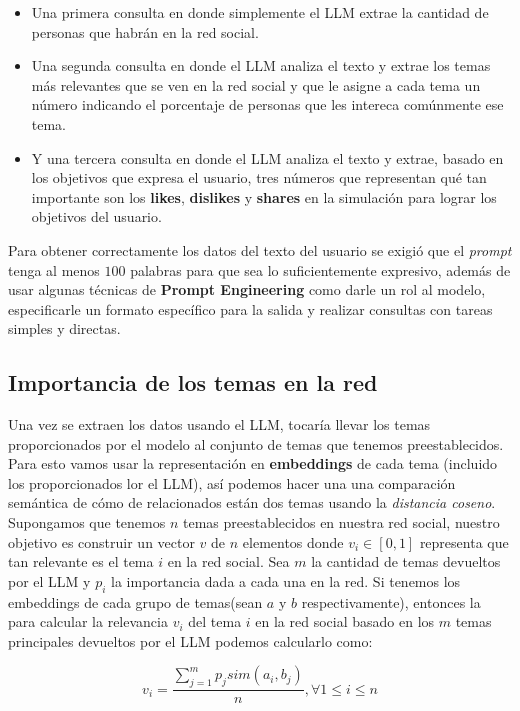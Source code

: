 \documentclass[acmtog]{acmart}
\begin{document}
\begin{itemize}
    \item Una primera consulta en donde simplemente el LLM extrae la cantidad de personas que habrán en la red social.
    \item Una segunda consulta en donde el LLM analiza el texto y extrae los temas más relevantes que se ven en la red social y que le asigne a cada tema un número indicando el porcentaje de personas que les intereca comúnmente ese tema.
    \item Y una tercera consulta en donde el LLM analiza el texto y extrae, basado en los objetivos que expresa el usuario, tres números que representan qué tan importante son los \textbf{likes}, \textbf{dislikes} y \textbf{shares} en la simulación para lograr los objetivos del usuario.
\end{itemize}

Para obtener correctamente los datos del texto del usuario se exigió que el \textit{prompt} tenga al menos $100$ palabras para que sea lo suficientemente expresivo, además de usar algunas técnicas de \textbf{Prompt Engineering} como darle un rol al modelo, especificarle un formato específico para
la salida y realizar consultas con tareas simples y directas.

\subsection{Importancia de los temas en la red}

Una vez se extraen los datos usando el LLM, tocaría llevar los temas proporcionados por el modelo al conjunto de temas que tenemos preestablecidos. Para esto vamos usar la representación en \textbf{embeddings} de cada tema (incluido los proporcionados lor el LLM),
así podemos hacer una una comparación semántica de cómo de relacionados están dos temas usando la \textit{distancia coseno}.
\\
Supongamos que tenemos $n$ temas preestablecidos en nuestra red social, nuestro objetivo es construir un vector $v$ de $n$ elementos donde $v_i \in [0,1]$ representa que tan relevante es el tema $i$ en la red social. Sea $m$ la cantidad de temas devueltos por el LLM y $p_i$ la importancia dada a cada una en la red.
Si tenemos los embeddings de cada grupo de temas(sean $a$ y $b$ respectivamente), entonces la para calcular la relevancia $v_i$ del tema $i$ en la red social basado en los $m$ temas principales devueltos por el LLM podemos calcularlo como:

$$
v_i = \frac{\sum_{j=1}^{m} p_j sim(a_i, b_j)}{n},  \forall 1 \leq i \leq n   
$$
\end{document}
